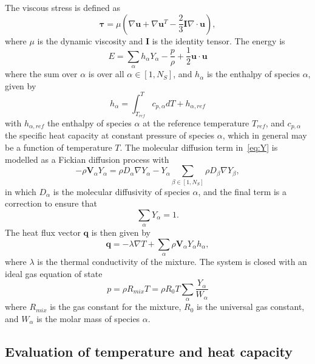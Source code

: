 \documentclass[notitlepage]{article}
\begin{document}
The viscous stress is defined as 
\begin{equation}\bm{\tau}=\mu\left(\nabla\bm{u}+\nabla\bm{u}^{T}-\frac{2}{3}\bm{I}\nabla\cdot\bm{u}\right)\label{eq:tau},\end{equation}
where $\mu$ is the dynamic viscosity and $\bm{I}$ is the identity tensor. The energy is
\begin{equation}E=\displaystyle\sum_{\alpha}h_{\alpha}Y_{\alpha}-\frac{p}{\rho}+\frac{1}{2}\bm{u}\cdot\bm{u}\label{eq:E}\end{equation}
where the sum over $\alpha$ is over all $\alpha\in\left[1,N_{S}\right]$, and $h_{\alpha}$ is the enthalpy of species $\alpha$, given by
\begin{equation}h_{\alpha}=\displaystyle\int_{T_{ref}}^{T}c_{p,\alpha}dT + h_{\alpha,ref}\label{eq:h}\end{equation}
with $h_{\alpha,ref}$ the enthalpy of species $\alpha$ at the reference temperature $T_{ref}$, and $c_{p,\alpha}$ the specific heat capacity at constant pressure of species $\alpha$, which in general may be a function of temperature $T$.
The molecular diffusion term in~\eqref{eq:Y} is modelled as a Fickian diffusion process with
\begin{equation}-\rho\bm{V}_{\alpha}Y_{\alpha}=\rho{D}_{\alpha}\nabla{Y}_{\alpha}-Y_{\alpha}\displaystyle\sum_{\beta\in\left[1,N_{S}\right]}\rho{D}_{\beta}\nabla{Y}_{\beta}\label{eq:fickdiff},\end{equation}
in which $D_{\alpha}$ is the molecular diffusivity of species $\alpha$, and the final term is a correction to ensure that 
\begin{equation}\displaystyle\sum_{\alpha}Y_{\alpha}=1.\end{equation}
The heat flux vector $\bm{q}$ is then given by
\begin{equation}\bm{q}=-\lambda\nabla{T}+\displaystyle\sum_{\alpha}\rho\bm{V}_{\alpha}Y_{\alpha}h_{\alpha}\label{eq:hfv},\end{equation}
where $\lambda$ is the thermal conductivity of the mixture.
The system is closed with an ideal gas equation of state
\begin{equation}p=\rho{R}_{mix}T=\rho{R}_{0}T\displaystyle\sum_{\alpha}\frac{Y_{\alpha}}{W_{\alpha}}\label{eq:eos}\end{equation}
where $R_{mix}$ is the gas constant for the mixture, $R_{0}$ is the universal gas constant, and $W_{\alpha}$ is the molar mass of species $\alpha$.

\subsection{Evaluation of temperature and heat capacity}
\end{document}

